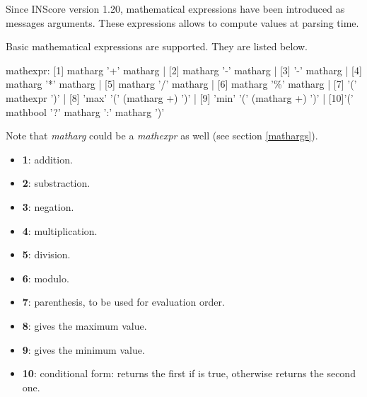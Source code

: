 

\newcommand{\mathstring}[1]		{\textit{string}(\OSC{#1})}
\newcommand{\mathstrnum}[1]		{\textit{length}(\OSC{#1})}
\newcommand{\mathsize}[1]		{\textit{size}(\OSC{#1})}
\newcommand{\op}				{$op$}
\newcommand{\todo}	[1]			{{\big [\texttt{\textbf{#1}}]}}

\label{mathExpr}

Since INScore version 1.20, mathematical expressions have been introduced as messages arguments. These expressions allows to compute values at parsing time.

\label{Operators}

Basic mathematical expressions are supported. They are listed below.


\begin{rail}
mathexpr:     [1] matharg '+' matharg
			| [2] matharg '-' matharg
			| [3] '-' matharg
			| [4] matharg '*' matharg
			| [5] matharg '/' matharg
			| [6] matharg '\%' matharg
			| [7] '(' mathexpr ')'
			| [8] 'max' '(' (matharg +) ')'
			| [9] 'min' '(' (matharg +) ')'
			| [10]'(' mathbool '?' matharg ':' matharg ')'
\end{rail}

Note that \textit{matharg} could be a \textit{mathexpr} as well (see section \ref{mathargs}).

\begin{itemize}
\item \textbf{1}: addition.
\item \textbf{2}: substraction.
\item \textbf{3}: negation.
\item \textbf{4}: multiplication.
\item \textbf{5}: division.
\item \textbf{6}: modulo.
\item \textbf{7}: parenthesis, to be used for evaluation order.
\item \textbf{8}: gives the maximum value.
\item \textbf{9}: gives the minimum value.
\item \textbf{10}: conditional form: returns the first  if  is true, otherwise returns the second one.
\end{itemize}


